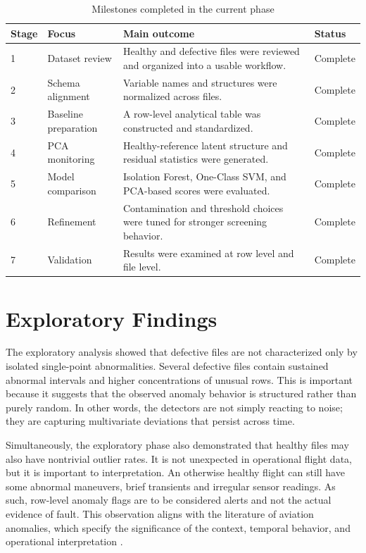 \documentclass[12pt,a4paper]{report}
\begin{document}
	\begin{table}[htbp]
		\centering
		\caption{Milestones completed in the current phase}
		\label{tab:milestones}
		\small
		\begin{tabular}{|p{1.5cm}|p{3.0cm}|p{7.3cm}|p{1.7cm}|}
			\hline
			\textbf{Stage} & \textbf{Focus} & \textbf{Main outcome} & \textbf{Status} \\
			\hline
			1 & Dataset review & Healthy and defective files were reviewed and organized into a usable workflow. & Complete \\
			\hline
			2 & Schema alignment & Variable names and structures were normalized across files. & Complete \\
			\hline
			3 & Baseline preparation & A row-level analytical table was constructed and standardized. & Complete \\
			\hline
			4 & PCA monitoring & Healthy-reference latent structure and residual statistics were generated. & Complete \\
			\hline
			5 & Model comparison & Isolation Forest, One-Class SVM, and PCA-based scores were evaluated. & Complete \\
			\hline
			6 & Refinement & Contamination and threshold choices were tuned for stronger screening behavior. & Complete \\
			\hline
			7 & Validation & Results were examined at row level and file level. & Complete \\
			\hline
		\end{tabular}
	\end{table}
	
	\section{Exploratory Findings}
	
	The exploratory analysis showed that defective files are not characterized only by isolated single-point abnormalities. Several defective files contain sustained abnormal intervals and higher concentrations of unusual rows. This is important because it suggests that the observed anomaly behavior is structured rather than purely random. In other words, the detectors are not simply reacting to noise; they are capturing multivariate deviations that persist across time.
	
	Simultaneously, the exploratory phase also demonstrated that healthy files may also have nontrivial outlier rates. It is not unexpected in operational flight data, but it is important to interpretation. An otherwise healthy flight can still have some abnormal maneuvers, brief transients and irregular sensor readings. As such, row-level anomaly flags are to be considered alerts and not the actual evidence of fault. This observation aligns with the literature of aviation anomalies, which specify the significance of the context, temporal behavior, and operational interpretation \cite{basora2019aviation,basora2021fleet,demir2024aiaviation}.
	
\end{document}
